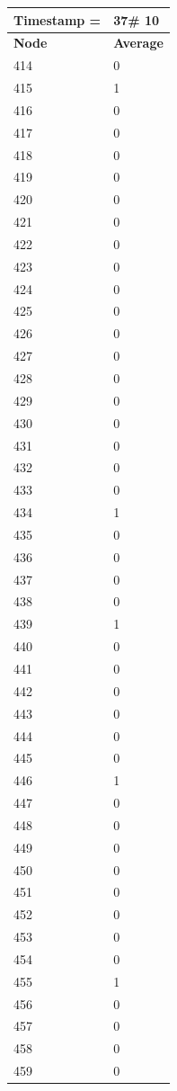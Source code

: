 \begin{tabular}{|l||l|}
\hline
\textbf{Timestamp =} & \textbf{37}\# 10\\\hline
	\textbf{Node} & \textbf{Average} \\ \hline
\hline
	414 & 0 \\ \hline
	415 & 1 \\ \hline
	416 & 0 \\ \hline
	417 & 0 \\ \hline
	418 & 0 \\ \hline
	419 & 0 \\ \hline
	420 & 0 \\ \hline
	421 & 0 \\ \hline
	422 & 0 \\ \hline
	423 & 0 \\ \hline
	424 & 0 \\ \hline
	425 & 0 \\ \hline
	426 & 0 \\ \hline
	427 & 0 \\ \hline
	428 & 0 \\ \hline
	429 & 0 \\ \hline
	430 & 0 \\ \hline
	431 & 0 \\ \hline
	432 & 0 \\ \hline
	433 & 0 \\ \hline
	434 & 1 \\ \hline
	435 & 0 \\ \hline
	436 & 0 \\ \hline
	437 & 0 \\ \hline
	438 & 0 \\ \hline
	439 & 1 \\ \hline
	440 & 0 \\ \hline
	441 & 0 \\ \hline
	442 & 0 \\ \hline
	443 & 0 \\ \hline
	444 & 0 \\ \hline
	445 & 0 \\ \hline
	446 & 1 \\ \hline
	447 & 0 \\ \hline
	448 & 0 \\ \hline
	449 & 0 \\ \hline
	450 & 0 \\ \hline
	451 & 0 \\ \hline
	452 & 0 \\ \hline
	453 & 0 \\ \hline
	454 & 0 \\ \hline
	455 & 1 \\ \hline
	456 & 0 \\ \hline
	457 & 0 \\ \hline
	458 & 0 \\ \hline
	459 & 0 \\ \hline
\end{tabular}
